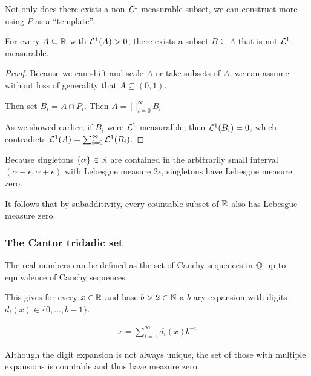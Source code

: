 Not only does there exists a non-$\mathcal{L}^{1}$-measurable subset, we can construct more using $P$ as a ``template''.

\begin{prop}[]
  For every $A \subseteq \mathbb{R}$ with $\mathcal{L}^{1}(A) > 0$, there exists a subset $B \subseteq A$ that is not $\mathcal{L}^{1}$-measurable.
\end{prop}
\begin{proof}
  Because we can shift and scale $A$ or take subsets of $A$, we can assume without loss of generality that $A \subseteq (0,1)$.

  Then set $B_i = A \cap P_i$. Then $A = \bigsqcup_{i=0}^{\infty}B_i$

  As we showed earlier, if $B_i$ were $\mathcal{L}^{1}$-measuralble, then $\mathcal{L}^{1}(B_i) = 0$, which contradicts $\mathcal{L}^{1}(A) = \sum_{i=0}^{\infty} \mathcal{L}^{1}(B_i)$.
\end{proof}

\begin{rem}[]
  Because singletons $\{\alpha\} \in \mathbb{R}$ are contained in the arbitrarily small interval $(\alpha - \epsilon, \alpha + \epsilon)$ with Lebesgue measure $2 \epsilon$,
  singletons have Lebesgue measure zero.

  It follows that by subadditivity, every countable subset of $\mathbb{R}$ also has Lebesgue measure zero.
\end{rem}



\subsubsection*{The Cantor tridadic set} 

The real numbers can be defined as the set of Cauchy-sequences in $\mathbb{Q}$ up to equivalence of Cauchy sequences.

This gives for every $x \in \mathbb{R}$ and base $b > 2 \in \mathbb{N}$ a $b$-ary expansion with digits $d_i(x) \in \{0,\ldots,b-1\}$.

\begin{align*}
  x = \sum_{i=1}^{\infty}d_i(x) b^{-i}
\end{align*}

Although the digit expansion is not always unique, the set of those with multiple expansions is countable and thus have measure zero.

